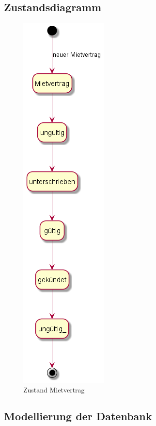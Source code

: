 \subsection{Zustandsdiagramm}
\begin{figure}[H]
  \begin{center}
    \includegraphics[height=0.85\textheight]{content/diagrams/out/zustand/mietvertrag/mietvertrag.png}
    \caption{Zustand Mietvertrag}
    \label{zustMietvertrag}
  \end{center}
\end{figure}

\subsection{Modellierung der Datenbank}

